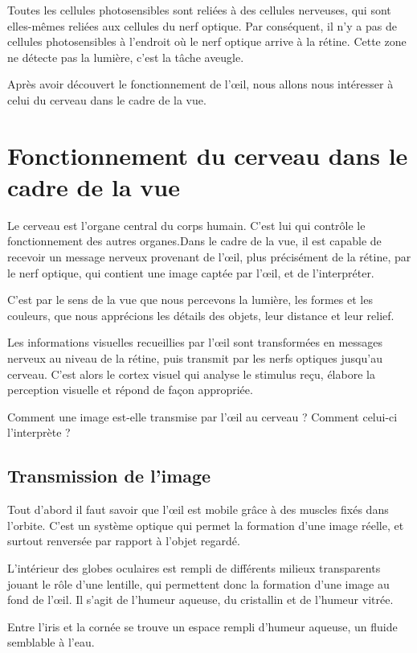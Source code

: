\documentclass[a4paper, 12pt, onecolumn, openany]{report}
\begin{document}
	Toutes les cellules photosensibles sont reliées à des cellules nerveuses, qui sont elles-mêmes reliées aux cellules du nerf optique. Par conséquent, il n’y a pas de cellules photosensibles à l’endroit où le nerf optique arrive à la rétine. Cette zone ne détecte pas la lumière, c’est la tâche aveugle.
	
	Après avoir découvert le fonctionnement de l’œil, nous allons nous intéresser à celui du cerveau dans le cadre de la vue.

	\section{Fonctionnement du cerveau dans le cadre de la vue}
	Le cerveau est l’organe central du corps humain. C’est lui qui contrôle le fonctionnement des autres organes.Dans le cadre de la vue, il est capable de recevoir un message nerveux provenant de l’œil, plus précisément de la rétine, par le nerf optique, qui contient une image captée par l’œil, et de l’interpréter.
	
	C'est par le sens de la vue que nous percevons la lumière, les formes et les couleurs, que nous apprécions les détails des objets, leur distance et leur relief.
	
	Les informations visuelles recueillies par l'œil sont transformées en messages nerveux au niveau de la rétine, puis transmit par les nerfs optiques jusqu'au cerveau. C'est alors le cortex visuel qui analyse le stimulus reçu, élabore la perception visuelle et répond de façon appropriée.
	
	Comment une image est-elle transmise par l’œil au cerveau ? Comment celui-ci l’interprète ?

		\subsection{Transmission de l'image}
		Tout d'abord il faut savoir que  l'œil est mobile grâce à des muscles fixés dans l'orbite. C'est un système optique qui permet la formation d'une image réelle, et surtout  renversée par rapport à l'objet regardé.  
	
	L'intérieur des globes oculaires est rempli de différents milieux transparents jouant le rôle d'une lentille, qui permettent donc la formation d'une image au fond de l'œil. Il s'agit de l'humeur aqueuse, du cristallin et de l'humeur vitrée.
	
	Entre l'iris et la cornée se trouve un espace rempli d'humeur aqueuse, un fluide semblable à l'eau.
	
\end{document}

